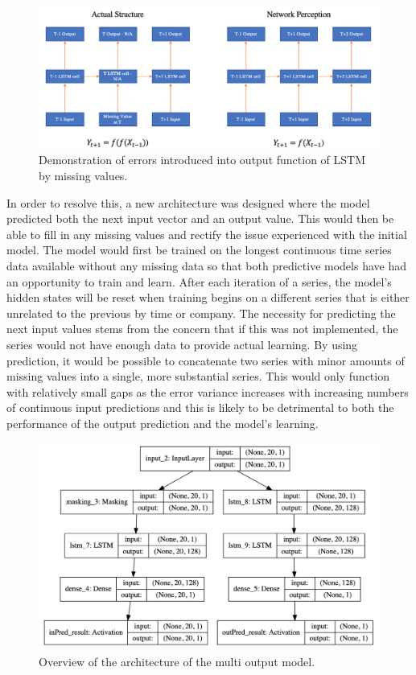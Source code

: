 \documentclass[10pt,onecolumn,letterpaper]{article}
\begin{document}
\begin{figure}[!hbt!]
\centering
\includegraphics[width=16.5cm]{rnn_missingval_perception.png}
\caption{Demonstration of errors introduced into output function of LSTM by missing values.}
\end{figure}

In order to resolve this, a new architecture was designed where the model predicted both the next input vector and an output value. This would then be able to fill in any missing values and rectify the issue experienced with the initial model. The model would first be trained on the longest continuous time series data available without any missing data so that both predictive models have had an opportunity to train and learn. After each iteration of a series, the model's hidden states will be reset when training begins on a different series that is either unrelated to the previous by time or company. The necessity for predicting the next input values stems from the concern that if this was not implemented, the series would not have enough data to provide actual learning. By using prediction, it would be possible to concatenate two series with minor amounts of missing values into a single, more substantial series. This would only function with relatively small gaps as the error variance increases with increasing numbers of continuous input predictions and this is likely to be detrimental to both the performance of the output prediction and the model's learning.
\begin{figure}[!hbt!]
\centering
\includegraphics[width=14.5cm]{multi_output.png}
\caption{Overview of the architecture of the multi output model.}
\end{figure}
\end{document}
